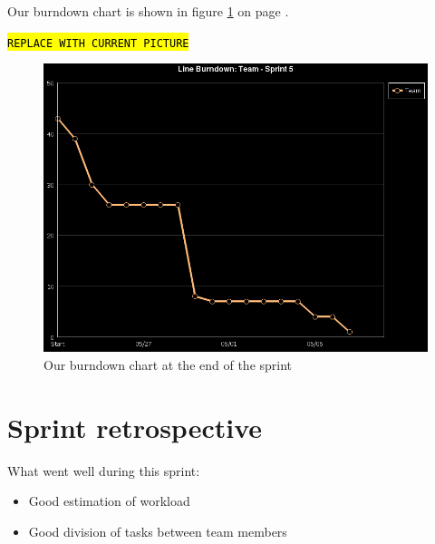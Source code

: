 \documentclass[a4paper,11pt]{article}
\begin{document}
Our burndown chart is shown in figure \ref{burndown} on page \pageref{burndown}.

{ %
\texttt{\hl{REPLACE WITH CURRENT PICTURE}\\}
}

 \begin{figure}[ht!]
 	\begin{center}
 	\includegraphics[width=\textwidth]{line_burndown.png}		
 	\end{center}
 	\caption{Our burndown chart at the end of the sprint}
 	\label{burndown}
 \end{figure}

%
%

\clearpage

\section{Sprint retrospective}

What went well during this sprint:

\begin{itemize}
\item Good estimation of workload
\item Good division of tasks between team members
\end{itemize}
\end{document}
